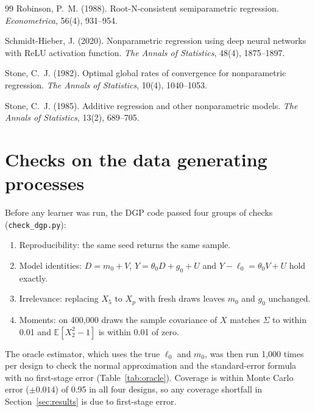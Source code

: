 \documentclass[11pt,a4paper]{article}
\newcommand{\E}{\mathbb{E}}
\newcommand{\code}[1]{\texttt{#1}}
\begin{document}
\begin{thebibliography}{99}
 Robinson, P.~M. (1988). Root-N-consistent semiparametric regression. \emph{Econometrica}, 56(4), 931--954.

 Schmidt-Hieber, J. (2020). Nonparametric regression using deep neural networks with ReLU activation function. \emph{The Annals of Statistics}, 48(4), 1875--1897.

 Stone, C.~J. (1982). Optimal global rates of convergence for nonparametric regression. \emph{The Annals of Statistics}, 10(4), 1040--1053.

 Stone, C.~J. (1985). Additive regression and other nonparametric models. \emph{The Annals of Statistics}, 13(2), 689--705.

\end{thebibliography}

\appendix
\renewcommand{\thetable}{\Alph{section}\arabic{table}}
\makeatletter{}\makeatother

\section{Checks on the data generating processes}\label{app:dgp}

Before any learner was run, the DGP code passed four groups of checks (\code{check\_dgp.py}):
\begin{enumerate}
\item Reproducibility: the same seed returns the same sample.
\item Model identities: $D=m_0+V$, $Y=\theta_0D+g_0+U$ and $Y-\ell_0=\theta_0V+U$ hold exactly.
\item Irrelevance: replacing $X_5$ to $X_p$ with fresh draws leaves $m_0$ and $g_0$ unchanged.
\item Moments: on 400,000 draws the sample covariance of $X$ matches $\Sigma$ to within 0.01 and $\E[X_2^2-1]$ is within 0.01 of zero.
\end{enumerate}
The oracle estimator, which uses the true $\ell_0$ and $m_0$, was then run 1,000 times per design to check the normal approximation and the standard-error formula with no first-stage error (Table~\ref{tab:oracle}). Coverage is within Monte Carlo error ($\pm0.014$) of 0.95 in all four designs, so any coverage shortfall in Section~\ref{sec:results} is due to first-stage error.
\end{document}
